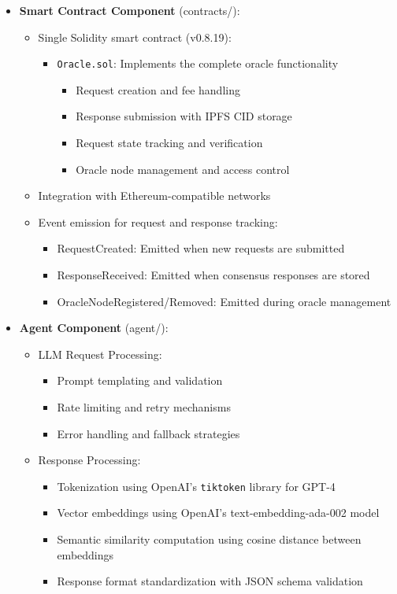 \documentclass[12pt]{article}
\begin{document}
\begin{itemize}
    \item \textbf{Smart Contract Component} (contracts/):
    \begin{itemize}
        \item Single Solidity smart contract (v0.8.19):
        \begin{itemize}
            \item \texttt{Oracle.sol}: Implements the complete oracle functionality
            \begin{itemize}
                \item Request creation and fee handling
                \item Response submission with IPFS CID storage
                \item Request state tracking and verification
                \item Oracle node management and access control
            \end{itemize}
        \end{itemize}
        \item Integration with Ethereum-compatible networks
        \item Event emission for request and response tracking:
        \begin{itemize}
            \item RequestCreated: Emitted when new requests are submitted
            \item ResponseReceived: Emitted when consensus responses are stored
            \item OracleNodeRegistered/Removed: Emitted during oracle management
        \end{itemize}
    \end{itemize}

    \item \textbf{Agent Component} (agent/):
    \begin{itemize}
        \item LLM Request Processing:
        \begin{itemize}
            \item Prompt templating and validation
            \item Rate limiting and retry mechanisms
            \item Error handling and fallback strategies
        \end{itemize}
        \item Response Processing:
        \begin{itemize}
            \item Tokenization using OpenAI's \texttt{tiktoken} library for GPT-4
            \item Vector embeddings using OpenAI's text-embedding-ada-002 model
            \item Semantic similarity computation using cosine distance between embeddings
            \item Response format standardization with JSON schema validation
        \end{itemize}
    \end{itemize}


\end{itemize}
\end{document}
